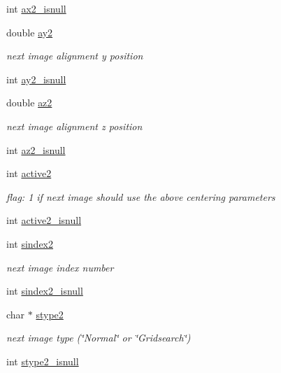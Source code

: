 \begin{DoxyCompactItemize}
int \hyperlink{structlspg__nextshot__struct_a846845b0b9ecf6517ef85554771ec71d}{ax2\-\_\-isnull}
\item 
double \hyperlink{structlspg__nextshot__struct_ad13759740204b42e379161f98815f3d0}{ay2}
\begin{DoxyCompactList}\small\item\em next image alignment y position \end{DoxyCompactList}\item 
int \hyperlink{structlspg__nextshot__struct_ad0f50ec6339296d3d39c8d95131ab6b5}{ay2\-\_\-isnull}
\item 
double \hyperlink{structlspg__nextshot__struct_a94698a030fd5b2abf1f10a2ad33476a4}{az2}
\begin{DoxyCompactList}\small\item\em next image alignment z position \end{DoxyCompactList}\item 
int \hyperlink{structlspg__nextshot__struct_a95d080f13a4e02b9aa883821ee3e721c}{az2\-\_\-isnull}
\item 
int \hyperlink{structlspg__nextshot__struct_a2875aa18df587806a3d8c05220fd62b5}{active2}
\begin{DoxyCompactList}\small\item\em flag\-: 1 if next image should use the above centering parameters \end{DoxyCompactList}\item 
int \hyperlink{structlspg__nextshot__struct_a1aa11ff4a4c8d69695786b4349e84e6b}{active2\-\_\-isnull}
\item 
int \hyperlink{structlspg__nextshot__struct_ae9d0cfdff6868e0ba9cd5acafbe133db}{sindex2}
\begin{DoxyCompactList}\small\item\em next image index number \end{DoxyCompactList}\item 
int \hyperlink{structlspg__nextshot__struct_a28e0b5c32a2741ef22edeb9d35b04e4d}{sindex2\-\_\-isnull}
\item 
char $\ast$ \hyperlink{structlspg__nextshot__struct_ae08ef74ea76e6e099a3ff6c7f845d337}{stype2}
\begin{DoxyCompactList}\small\item\em next image type (\char`\"{}\-Normal\char`\"{} or \char`\"{}\-Gridsearch\char`\"{}) \end{DoxyCompactList}\item 
int \hyperlink{structlspg__nextshot__struct_a203e29ed0bb403aaab6d7f95f690cc0d}{stype2\-\_\-isnull}
\end{DoxyCompactItemize}


